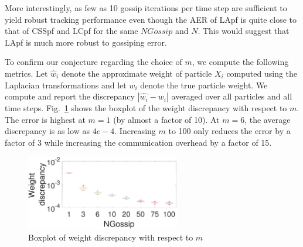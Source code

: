 \documentclass[10pt,letterpaper,final]{article}
\begin{document}
More interestingly, as few as 10 gossip iterations per time step are sufficient to yield robust tracking performance even though the AER of LApf is quite close to that of CSSpf and LCpf for the same $NGossip$ and $N$. This would suggest that LApf is much more robust to gossiping error. 


To confirm our conjecture regarding the choice of $m$, we compute the following metrics. Let $\hat{w}_i$ denote the approximate weight of particle $X_i$ computed using the Laplacian transformations and let $w_i$ denote the true particle weight. We compute and report the discrepancy $|\hat{w_i}-w_i|$ averaged over all particles and all time steps. Fig.~\ref{fig:boxplot_LApf_weight_discrepancy} shows the boxplot of the weight discrepancy with respect to $m$. The error is highest at $m=1$ (by almost a factor of 10). At $m=6$, the average discrepancy is as low as $4e-4$. Increasing $m$ to 100 only reduces the error by a factor of 3 while increasing the communication overhead by a factor of 15.  

\begin{figure}
\centering
\includegraphics[width=0.6\textwidth]{Figures/boxplot_LApf_weight_discrepancy}
\caption{Boxplot of weight discrepancy with respect to $m$}
\label{fig:boxplot_LApf_weight_discrepancy}
\end{figure}
\end{document}
